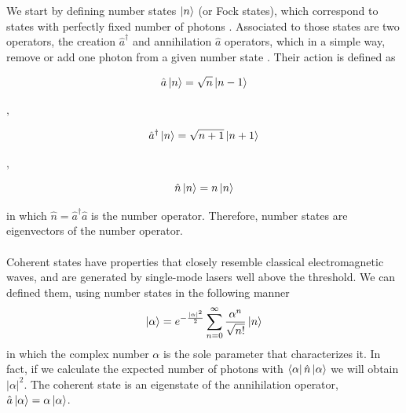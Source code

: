 We start by defining number states $\ket{n}$ (or Fock states), which correspond to states with perfectly fixed number of photons
\cite{loudon2000}.
Associated to those states are two operators, the creation $\hat{a}^\dagger$ and annihilation $\hat{a}$ operators, which in a simple way, remove or add one photon from a given number state
\cite{fox2006}.
Their action is defined as
%
\begin{center}
	\hspace{-4mm}
	\begin{minipage}{44mm}
		\noindent
		\begin{equation}
			\hat{a} \ket{n} = \sqrt{n} \ket{n-1}
		\end{equation}
	\end{minipage}
	$,\quad$
	\begin{minipage}{52mm}
		\noindent
		\begin{equation}
			\hat{a}^\dagger \ket{n} = \sqrt{n+1} \ket{n+1}
		\end{equation}
	\end{minipage}
	$,\quad$
	\begin{minipage}{35mm}
		\noindent
		\begin{equation}
			\hat{n} \ket{n} = n \ket{n}
		\end{equation}
	\end{minipage}
\end{center}
%
in which $\hat{n} = \hat{a}^\dagger\hat{a}$ is the number operator. Therefore, number states are eigenvectors of the number operator.\\
\\
Coherent states have properties that closely resemble classical electromagnetic waves, and are generated by single-mode lasers well above the threshold.
\cite{loudon2000}
We can defined them, using number states in the following manner
\begin{equation}
\ket{\alpha} = e^{-\frac{|\alpha|^2}{2}} \sum_{n=0}^\infty \frac{\alpha^n}{\sqrt{n!}} \ket{n}
\end{equation}
in which the complex number $\alpha$ is the sole parameter that characterizes it.
In fact, if we calculate the expected number of photons with $\bra{\alpha} \hat{n} \ket{\alpha}$ we will obtain $|\alpha|^2$. The coherent state is an eigenstate of the annihilation operator, $\hat{a}\ket{\alpha} = \alpha \ket{\alpha}$.\\
\\
